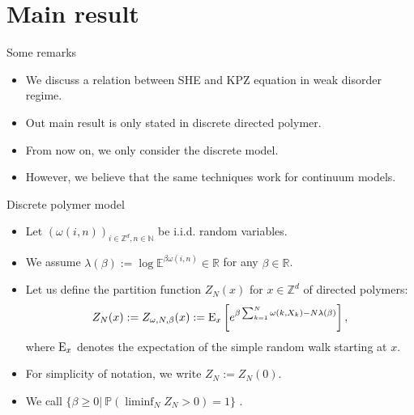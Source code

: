 \documentclass[10pt]{beamer}
\newcommand{\N}{\mathbb{N}}
\newcommand{\R}{\mathbb{R}}
\renewcommand{\P}{\mathbb{P
}}
\newcommand{\E}{\mathbb{E}}
\newcommand{\Z}{\mathbb{Z}}
\def\al#1{\begin{align*}#1\end{align*}}
\begin{document}
\section{Main result}
\begin{frame}{Some remarks}
\begin{itemize}
\item We discuss a relation between SHE and KPZ equation in weak disorder regime.
    \item 
    Out main result is only stated in discrete directed polymer.
    \item From now on, we only consider the discrete model.
    \item However, we believe that the same techniques work for continuum models.
    \end{itemize}
\end{frame}
\begin{frame}{Discrete polymer model}
\begin{itemize}
    \item     Let $(\omega(i,n))_{i\in\Z^d,n\in\N}$ be i.i.d. random variables.
    \item We assume $\lambda(\beta):=\log{\E^{\beta \omega(i,n)}}\in\R$ for any $\beta\in\R$.
    \item Let us define the partition function $Z_N(x)$ for $x\in\Z^d$ of directed polymers:
\al{
Z_N(x):=Z_{\omega,N,\beta}(x):={\rm E}_x\left[e^{\beta\sum_{k=1}^N\omega(k,X_k)-N\lambda(\beta)}\right],
}
where ${\rm E}_x$ denotes the expectation of the simple random walk starting at $x$. 
\item For simplicity of notation, we write $Z_N:=Z_N(0).$
\item We call $\{\beta\geq 0|~\P(\liminf_N Z_N>0)=1\}$ {\color{red}{the weak disorder regime}}. 
\end{itemize}
\end{frame}
\end{document}
